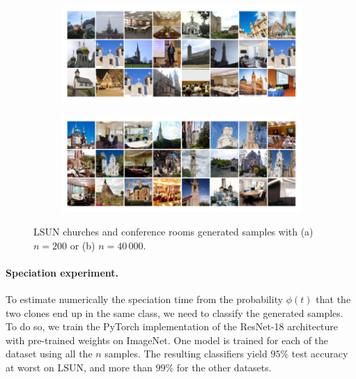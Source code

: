 \documentclass[10pt,twocolumn]{article}
\begin{document}
\begin{figure}[!htb]
\begin{subfigure}{.5\textwidth}
    \centering
    \includegraphics[width=\linewidth]{Figures_SM/samples_LSUN_100.pdf}
    \caption{}
\end{subfigure} \quad
\begin{subfigure}{.5\textwidth}
    \centering
    \includegraphics[width=\linewidth]{Figures_SM/samples_LSUN_20000.pdf}
    \caption{}
\end{subfigure}
\caption{LSUN churches and conference rooms generated samples with (a) $n= 200$ or (b) $n=40\,000$.}
\label{fig:samples_LSUN}
\end{figure}

\paragraph*{Speciation experiment.} To estimate numerically the speciation time from the probability $\phi(t)$ that the two clones end up in the same class, we need to classify the generated samples. To do so, we train the PyTorch \cite{Pytorch_2019} implementation of the ResNet-18 architecture \cite{Kaiming2015_ResNet} with pre-trained weights on ImageNet. One model is trained for each of the dataset using all the $n$ samples. The resulting classifiers yield $95$\% test accuracy at worst on LSUN, and more than $99$\% for the other datasets. \\
\end{document}
